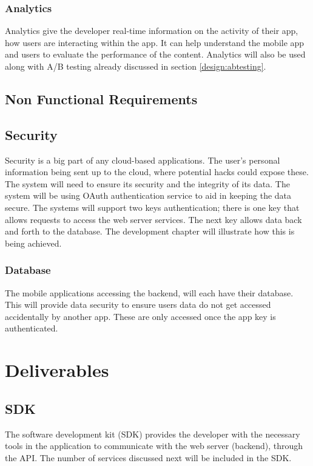 \subsubsection{Analytics} \label{d-p:analytics}
Analytics give the developer real-time information on the activity of their app, how users are interacting within the app. It can help understand the mobile app and users to evaluate the performance of the content. Analytics will also be used along with A/B testing already discussed in section \ref{design:abtesting}.

\subsection{Non Functional Requirements}

\subsection{Security}
Security is a big part of any cloud-based applications. The user's personal information being sent up to the cloud, where potential hacks could expose these. The system will need to ensure its security and the integrity of its data. The system will be using OAuth authentication service to aid in keeping the data secure. The systems will support two keys authentication; there is one key that allows requests to access the web server services. The next key allows data back and forth to the database. The development chapter will illustrate how this is being achieved.

\subsubsection{Database}
The mobile applications accessing the backend, will each have their database. This will provide data security to ensure users data do not get accessed accidentally by another app. These are only accessed once the app key is authenticated.

\section{Deliverables}

\subsection{SDK}

The software development kit (SDK) provides the developer with the necessary tools in the application to communicate with the web server (backend), through the API. The number of services discussed next will be included in the SDK.

